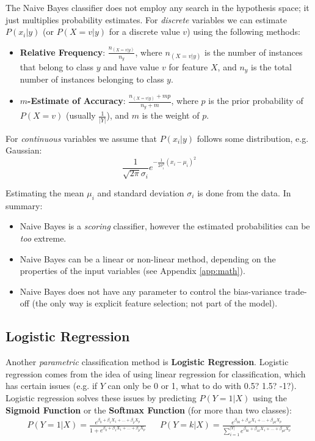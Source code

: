 \documentclass[12pt]{article}
\begin{document}
\noindent
The Naive Bayes classifier does not employ any search in the hypothesis space; it just multiplies probability estimates.
For \textit{discrete} variables we can estimate $P(x_i | y)$ (or $P(X = v | y)$ for a discrete value $v$) using the following methods:

\begin{itemize}
    \item \textbf{Relative Frequency}: $\displaystyle\frac{n_{(X = v | y)}}{n_y}$, where $n_{(X = v | y)}$ is the number of instances that belong to class $y$ and have value $v$ for feature $X$, and $n_y$ is the total number of instances belonging to class $y$.
    \item \textbf{$m$-Estimate of Accuracy}: $\displaystyle\frac{n_{(X = v | y)} + mp}{n_y + m}$, where $p$ is the prior probability of $P(X = v)$ (usually $\frac{1}{|Y|}$), and $m$ is the weight of $p$.
\end{itemize}

\noindent
For \textit{continuous} variables we assume that $P(x_i | y)$ follows some distribution, e.g. Gaussian:
\[ \frac{1}{\sqrt{2\pi}\sigma_i} e^{-\displaystyle\frac{1}{2\sigma_i^2}(x_i - \mu_i)^2} \]

\noindent
Estimating the mean $\mu_i$ and standard deviation $\sigma_i$ is done from the data.
In summary:

\begin{itemize}
    \item Naive Bayes is a \textit{scoring} classifier, however the estimated probabilities can be \textit{too} extreme.
    \item Naive Bayes can be a linear or non-linear method, depending on the properties of the input variables (see Appendix \ref{app:math}).
    \item Naive Bayes does not have any parameter to control the bias-variance trade-off (the only way is explicit feature selection; not part of the model).
\end{itemize}

\subsection{Logistic Regression}
\noindent
Another \textit{parametric} classification method is \textbf{Logistic Regression}.
Logistic regression comes from the idea of using linear regression for classification, which has certain issues (e.g. if $Y$ can only be 0 or 1, what to do with 0.5? 1.5? -1?).
Logistic regression solves these issues by predicting $P(Y = 1 | X)$ using the \textbf{Sigmoid Function} or the \textbf{Softmax Function} (for more than two classes):
\begin{align*}
    P(Y = 1 | X) = \frac{e^{\beta_0 + \beta_1 X_1 + ... + \beta_p X_p}}{1 + e^{\beta_0 + \beta_1 X_1 + ... + \beta_p X_p}} && P(Y = k | X) = \frac{e^{\beta_{0k} + \beta_{1k} X_1 + ... + \beta_{pk} X_p}}{\sum_{i = 1}^{|Y|} e^{\beta_{0k} + \beta_{1k} X_1 + ... + \beta_{pk} X_p}}
\end{align*}
\end{document}
